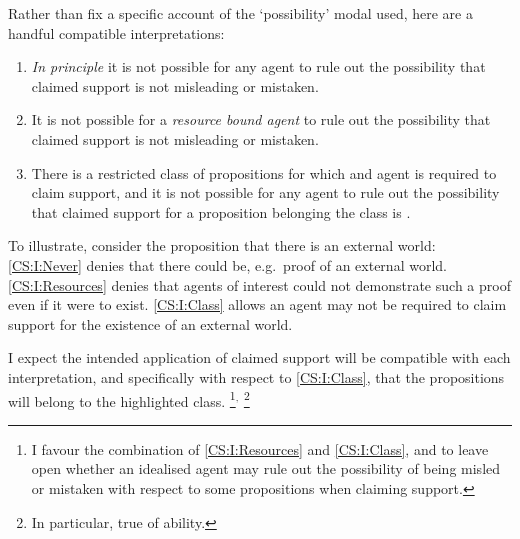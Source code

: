\begin{note}
  Rather than fix a specific account of the `possibility' modal used, here are a handful compatible interpretations:

  \begin{enumerate}[label=\Alph*., ref=(\Alph*)]
  \item\label{CS:I:Never} \emph{In principle} it is not possible for any agent to rule out the possibility that claimed support is not misleading or mistaken.
  \item\label{CS:I:Resources} It is not possible for a \emph{resource bound agent} to rule out the possibility that claimed support is not misleading or mistaken.
  \item\label{CS:I:Class} There is a restricted class of propositions for which and agent is required to claim support, and it is not possible for any agent to rule out the possibility that claimed support for a proposition belonging the class is \nmom{}.
  \end{enumerate}

  To illustrate, consider the proposition that there is an external world:
  \ref{CS:I:Never} denies that there could be, e.g.\ proof of an external world.
  \ref{CS:I:Resources} denies that agents of interest could not demonstrate such a proof even if it were to exist.
  \ref{CS:I:Class} allows an agent may not be required to claim support for the existence of an external world.

  I expect the intended application of claimed support will be compatible with each interpretation, and specifically with respect to \ref{CS:I:Class}, that the propositions will belong to the highlighted class.\nolinebreak
  \footnote{
    I favour the combination of \ref{CS:I:Resources} and \ref{CS:I:Class}, and to leave open whether an idealised agent may rule out the possibility of being misled or mistaken with respect to some propositions when claiming support.
  }\(^{,}\)\nolinebreak
  \footnote{
    In particular, true of ability.
  }
\end{note}

